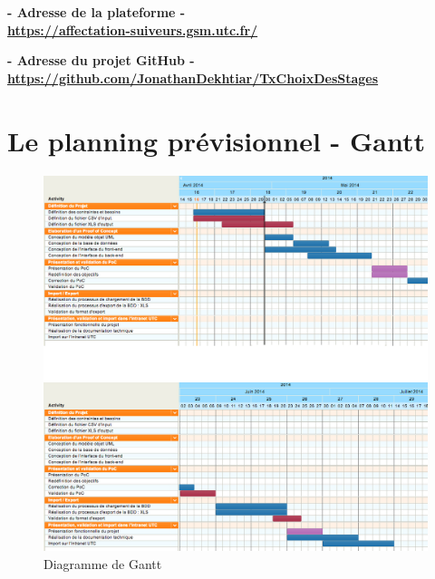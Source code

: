 \documentclass[a4paper,titlepage]{scrartcl}
\begin{document}
\vspace{1cm}

\Large
\begin{center}
\textbf{
- Adresse de la plateforme -\\
\url{https://affectation-suiveurs.gsm.utc.fr/}\\
}

\vspace{1cm}

\textbf{
- Adresse du projet GitHub -\\
\url{https://github.com/JonathanDekhtiar/TxChoixDesStages}\\
}
\end{center}
\normalsize

\clearpage


\section{Le planning prévisionnel - Gantt}

\begin{figure}[H]
	\vspace{-3mm}
	\begin{center}
		\includegraphics[scale=0.37]{Images/gantt.jpg}
		\caption{Diagramme de Gantt}
	\end{center}
\end{figure}
\end{document}
